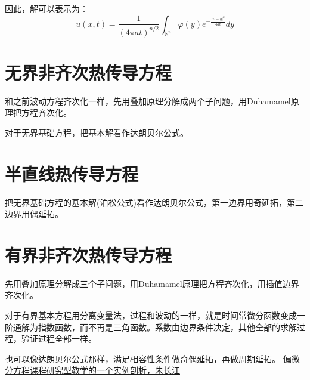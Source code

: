 \documentclass[12pt,a4paper]{article}
\numberwithin{subsection}{section}   %
\numberwithin{subsubsection}{subsection}
\theoremstyle{plain}
\theoremstyle{definition}
\theoremstyle{remark}
\theoremstyle{remark}
\begin{document}
	
	
	
	
	因此，解可以表示为：
	\begin{equation}
		u(x, t) = \frac{1}{(4\pi a t)^{n/2}} \int_{\mathbb{R}^n} \varphi(y) e^{-\frac{|x - y|^2}{4a t}} dy
	\end{equation}
	

	
		\newpage
	\section{无界非齐次热传导方程}
	和之前波动方程齐次化一样，先用叠加原理分解成两个子问题，用Duhamamel原理把方程齐次化。
	
	对于无界基础方程，把基本解看作达朗贝尔公式。
	
	\section{半直线热传导方程}
	把无界基础方程的基本解(泊松公式)看作达朗贝尔公式，第一边界用奇延拓，第二边界用偶延拓。
	
	
	\section{有界非齐次热传导方程}
	先用叠加原理分解成三个子问题，用Duhamamel原理把方程齐次化，用插值边界齐次化。
	
	对于有界基本方程用分离变量法，过程和波动的一样，就是时间常微分函数变成一阶通解为指数函数，而不再是三角函数。系数由边界条件决定，其他全部的求解过程，验证过程全部一样。
	
	也可以像达朗贝尔公式那样，满足相容性条件做奇偶延拓，再做周期延拓。
	\href{https://kns.cnki.net/kcms2/article/abstract?v=VQ0ntgfwFMTzN6hnFDpFMFM9DxAtYwMQhco2QSA-IEHGx9q5EylUyfVfvJ65vLbYgxi4GKWYtrw0WYFjulce4L-QdEJiwrbko6gMtLg1u_v-yZO9l1KqPNK5VVy0WXMK_iyRkdOb_3JYM79j78dC5ZO49R0B00eT_N_tEe4_tT88MKGKuKknjw==&uniplatform=NZKPT&language=CHS}{偏微分方程课程研究型教学的一个实例剖析，朱长江}
	
	
	
	
	
\end{document}
